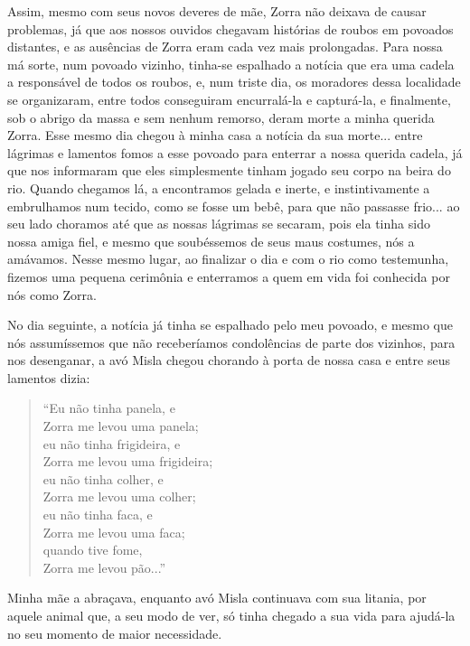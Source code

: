 Assim, mesmo com seus novos deveres de mãe, Zorra não deixava de causar problemas, já que aos nossos ouvidos chegavam histórias de roubos em povoados distantes, e as ausências de Zorra eram cada vez mais prolongadas.
Para nossa má sorte, num povoado vizinho, tinha-se espalhado a notícia que era uma cadela a responsável de todos os roubos, e, num triste dia, os moradores dessa localidade se organizaram, entre todos conseguiram encurralá-la e capturá-la, e finalmente, sob o abrigo da massa e sem nenhum remorso, deram morte a minha querida Zorra.
Esse mesmo dia chegou à minha casa a notícia da sua morte... entre lágrimas e lamentos fomos a esse povoado para enterrar a nossa querida cadela, já que nos informaram que eles simplesmente tinham jogado seu corpo na beira do rio. Quando chegamos lá, a encontramos gelada e inerte, e instintivamente a embrulhamos num tecido, como se fosse um bebê, para que não passasse frio... ao seu lado choramos até que as nossas lágrimas se secaram, pois ela tinha sido nossa amiga fiel, e mesmo que soubéssemos de  seus maus costumes, nós a amávamos.
Nesse mesmo lugar, ao finalizar o dia e com o rio como testemunha, fizemos uma pequena cerimônia e enterramos a quem em vida foi conhecida por nós como Zorra. 

No dia seguinte, a notícia já tinha se espalhado pelo meu povoado, e mesmo que nós assumíssemos que não receberíamos condolências de parte dos vizinhos, para nos desenganar, a avó Misla chegou chorando à porta de nossa casa e entre seus lamentos dizia:
\begin{quotation}
\noindent ``Eu não tinha panela, e \\Zorra me levou uma panela;\\ 
eu não tinha frigideira, e \\Zorra me levou uma frigideira;\\ 
eu não tinha colher, e \\Zorra me levou uma colher;\\
eu não tinha faca, e \\Zorra me levou uma faca;\\
quando tive fome, \\Zorra me levou pão...''
\end{quotation}
Minha mãe a abraçava, enquanto avó Misla continuava com sua litania, por aquele animal que, a seu modo de ver, só tinha chegado a sua vida para ajudá-la no seu momento de maior necessidade.
 


